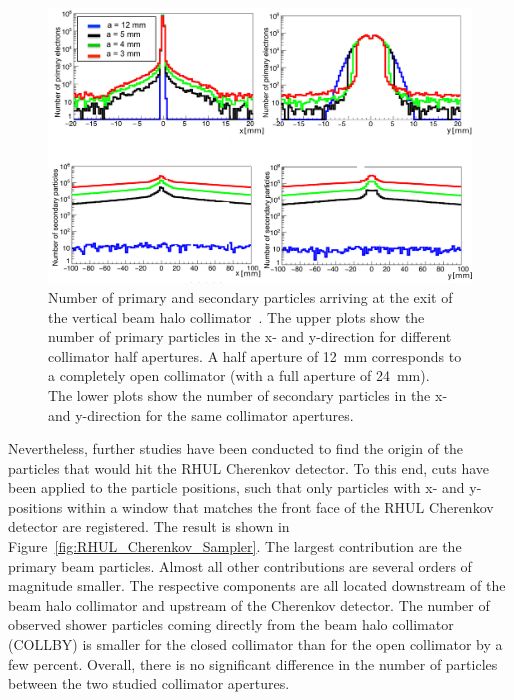\begin{figure}[!h]
\centering
\includegraphics[width=\textwidth]{Figures/ATF/Collimator_secondaries_Nuria_Thesis.png}
\caption[Number of particles at the beam halo collimator]{Number of primary and secondary particles arriving at the exit of the vertical beam halo collimator~\cite[cf. p. 152]{Nuria_Thesis}.
The upper plots show the number of primary particles in the x- and y-direction for different collimator half apertures.
A half aperture of \SI[detect-all]{12}{\milli\meter} corresponds to a completely open collimator (with a full aperture of \SI[detect-all]{24}{\milli\meter}).
\\The lower plots show the number of secondary particles in the x- and y-direction for the same collimator apertures.}
\label{fig:Particles_Collimator}
\end{figure}

Nevertheless, further studies have been conducted to find the origin of the particles that would hit the RHUL Cherenkov detector.
To this end, cuts have been applied to the particle positions, such that only particles with x- and y-positions within a window that matches the front face of the RHUL Cherenkov detector are registered.
The result is shown in Figure~\ref{fig:RHUL_Cherenkov_Sampler}.
The largest contribution are the primary beam particles.
Almost all other contributions are several orders of magnitude smaller.
The respective components are all located downstream of the beam halo collimator and upstream of the Cherenkov detector.
The number of observed shower particles coming directly from the beam halo collimator (COLLBY) is smaller for the closed collimator than for the open collimator by a few percent.
Overall, there is no significant difference in the number of particles between the two studied collimator apertures.

